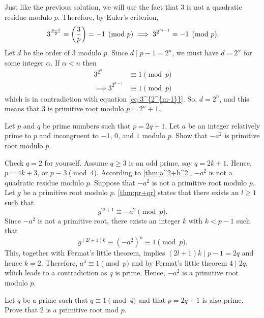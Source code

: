 \documentclass{subfile}
\begin{document}
	\begin{solution}[2]
		Just like the previous solution, we will use the fact that $3$ is not a quadratic residue modulo $p$. Therefore, by Euler's criterion,
			\begin{align}\label{eq:3^{2^{m-1}}}
				3^{\frac{p-1}{2}} \equiv  \left( \frac{3}{p} \right) = -1 \pmod p \implies 3^{2^{m-1}} \equiv -1 \pmod p.
			\end{align}
		Let $d$ be the order of $3$ modulo $p$. Since $d\mid p-1=2^n$, we must have $d=2^{\alpha}$ for some integer $\alpha$. If $\alpha<n$ then
			\begin{align*}
				3^{2^{\alpha}}
					& \equiv 1\pmod{p}\\
				\implies 3^{2^{n-1}}
					& \equiv 1\pmod{p}
			\end{align*}
		which is in contradiction with equation \eqref{eq:3^{2^{m-1}}}. So, $d=2^n$, and this means that $3$ is primitive root modulo $p=2^n+1$.
	\end{solution}

	\begin{problem}
		Let $p$ and $q$ be prime numbers such that $ p=2q+1$. Let $a$ be an integer relatively prime to $p$ and incongruent to $-1$, $0$, and $1$ modulo $p$. Show that $ -a^2$ is primitive root modulo $p$.
	\end{problem}

	\begin{solution}
		Check $ q=2$ for yourself. Assume $ q \ge 3$ is an odd prime, say $q=2k+1$. Hence, $ p=4k+3$, or $p \equiv 3 \pmod 4$. According to \autoref{thm:a^2+b^2}, $ -a^2$ is not a quadratic residue modulo $ p$. Suppose that $ -a^2$ is not a primitive root modulo $p$. Let $ g$ be a primitive root modulo $p$. \autoref{thm:pr+qr} states that there exists an $ l\ge 1$ such that $$g^{2l+1} \equiv -a^2 \pmod p.$$ Since $-a^2$ is not a primitive root, there exists an integer $k$ with $ k<p-1$ such that \[g^{(2l+1)k} \equiv (-a^2)^k \equiv 1 \pmod p .\] This, together with Fermat's little theorem, implies $ (2l+1)k \mid p-1=2q$ and hence $ k=2$. Therefore, $ a^4 \equiv 1 \pmod p$ and by Fermat's little theorem $ 4\mid 2q$, which leads to a contradiction as $q$ is prime. Hence, $ -a^2$ is a primitive root modulo $p$.
	\end{solution}

	\begin{problem}
		Let $q$ be a prime such that $q\equiv 1\pmod 4$ and that $p=2q+1$ is also prime. Prove that $2$ is a primitive root mod $p$.
	\end{problem}
\end{document}
